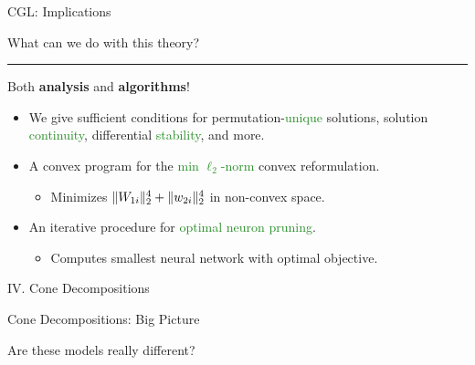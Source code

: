 \documentclass[usenames,dvipsnames,mathserif,notheorems]{beamer}
\newcommand{\horizontalrule}{
	{
			\vspace{-0.5em}
			\center \rule{\textwidth}{0.1em}
			\vspace{-0.2em}
		}
}
\newcommand{\green}[1]{\textcolor{ForestGreen}{#1}}
\begin{document}
\begin{frame}{CGL: Implications}
	\begin{center}
		\Large
		What can we do with this theory?
	\end{center}

	\pause
	\horizontalrule

	{\large Both \textbf{analysis} and \textbf{algorithms}!}
	\pause
	\begin{itemize}
		\item We give sufficient conditions for permutation-\green{unique} solutions,
		      solution \green{continuity}, differential \green{stability}, and more.

		      \pause
		      \vspace{1ex}
		\item A convex program for the \green{min \( \ell_2 \)-norm} convex reformulation.
		      \begin{itemize}
			      \item Minimizes \( \|W_{1i}\|_2^4 + \|w_{2i}\|_2^4 \) in non-convex space.
		      \end{itemize}

		      \pause
		      \vspace{1ex}
		\item An iterative procedure for \green{optimal neuron pruning}.
		      \begin{itemize}
			      \item Computes smallest neural network with optimal objective.
		      \end{itemize}
	\end{itemize}

\end{frame}


\begin{frame}{}
	\begin{center}
		\huge IV. Cone Decompositions
	\end{center}
\end{frame}

\begin{frame}{Cone Decompositions: Big Picture}
	\begin{center}
		\Large Are these models really different?
	\end{center}

	\begin{figure}[]
		\centering
		
	\end{figure}
\end{frame}
\end{document}
